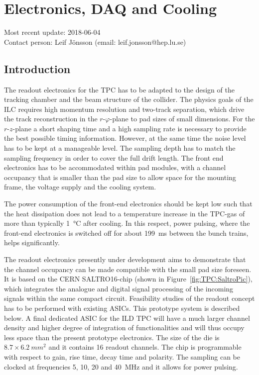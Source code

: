\section{Electronics, DAQ and Cooling}
\label{chap:TPC_sec:electronics}
Most recent update: 2018-06-04 \\
Contact person: Leif J{\"o}nsson (email: leif.jonsson@hep.lu.se)

\subsection{Introduction}
The readout electronics for the TPC has to be adapted to the design of the tracking chamber and the beam structure of the collider. The physics goals of the ILC requires high momentum resolution and two-track separation, which drive the track reconstruction in the $r\text{-}\varphi$-plane to pad sizes of small dimensions. For the $r\text{-}z$-plane a short shaping time and a high sampling rate is necessary to provide the best possible timing information. However, at the same time the noise level has to be kept at a manageable level. The sampling depth has to match the sampling frequency in order to cover the full drift length. The front end electronics has to be accommodated within pad modules, with a channel occupancy that is smaller than the pad size to allow space for the mounting frame, the voltage supply and the cooling system.

The power consumption of the front-end electronics should be kept low such that the heat dissipation does not lead to a temperature increase in the TPC-gas of more than typically \SI{1}{\degreeCelsius} after cooling. In this respect, power pulsing, where the front-end electronics is switched off for about \SI{199}{ms} between the bunch trains, helps significantly.

The readout electronics presently under development aims to demonstrate that the channel occupancy can be made compatible with the small pad size foreseen. It is based on the CERN SALTRO16-chip (shown in Figure~\ref{fig:TPC:SaltroPic}), which integrates the analogue and digital signal processing of the incoming signals within the same compact circuit. Feasibility studies of the readout concept has to be performed with existing ASICs. This prototype system is described below. A final dedicated ASIC for the ILD TPC will have a much larger channel density and higher degree of integration of functionalities and will thus occupy less space than the present prototype electronics. The size of the die is $8.7 \times \SI{6.2}{mm^2}$ and it contains 16 readout channels. The chip is programmable with respect to gain, rise time, decay time and polarity. The sampling can be clocked at frequencies 5, 10, 20 and \SI{40}{MHz} and it allows for power pulsing.

